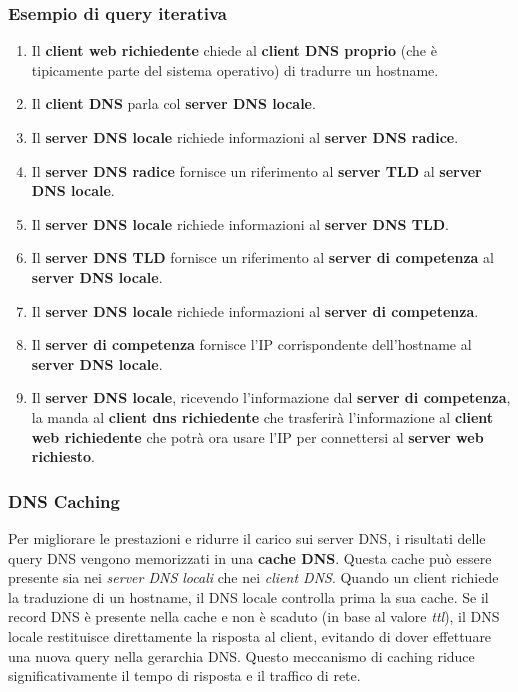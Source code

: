 \subsubsection*{Esempio di query iterativa}
\begin{enumerate}
\item Il \textbf{client web richiedente} chiede al \textbf{client DNS proprio} (che è tipicamente parte del sistema operativo) di tradurre un hostname.
\item Il \textbf{client DNS} parla col \textbf{server DNS locale}.
\item Il \textbf{server DNS locale} richiede informazioni al \textbf{server DNS radice}.
\item Il \textbf{server DNS radice} fornisce un riferimento al \textbf{server TLD} al \textbf{server DNS locale}.
\item Il \textbf{server DNS locale} richiede informazioni al \textbf{server DNS TLD}.
\item Il \textbf{server DNS TLD} fornisce un riferimento al \textbf{server di competenza} al \textbf{server DNS locale}.
\item Il \textbf{server DNS locale} richiede informazioni al \textbf{server di competenza}.
\item Il \textbf{server di competenza} fornisce l'IP corrispondente dell'hostname al \textbf{server DNS locale}.
\item Il \textbf{server DNS locale}, ricevendo l'informazione dal \textbf{server di competenza}, la manda al \textbf{client dns richiedente} che trasferirà l'informazione al \textbf{client web richiedente} che potrà ora usare l'IP per connettersi al \textbf{server web richiesto}.
\end{enumerate}

\subsubsection*{DNS Caching}
Per migliorare le prestazioni e ridurre il carico sui server DNS, i risultati delle query DNS vengono memorizzati in una \textbf{cache DNS}. Questa cache può essere presente sia nei \textit{server DNS locali} che nei \textit{client DNS}. Quando un client richiede la traduzione di un hostname, il DNS locale controlla prima la sua cache. Se il record DNS è presente nella cache e non è scaduto (in base al valore \textit{ttl}), il DNS locale restituisce direttamente la risposta al client, evitando di dover effettuare una nuova query nella gerarchia DNS. Questo meccanismo di caching riduce significativamente il tempo di risposta e il traffico di rete.

